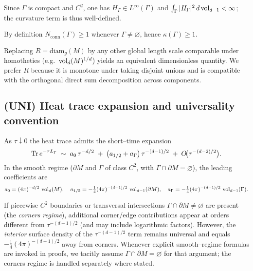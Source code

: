 \begin{remark}\label{rem:H-L2}
Since $\Gamma$ is compact and $C^2$, one has $H_\Gamma\in L^\infty(\Gamma)$ and $\int_\Gamma |H_\Gamma|^2\,d\operatorname{vol}_{d-1}<\infty$; the curvature term is thus well-defined.
\end{remark}

\begin{remark}\label{rem:kappa-nondeg}
By definition $N_{\mathrm{conn}}(\Gamma)\ge 1$ whenever $\Gamma\neq\varnothing$, hence $\kappa(\Gamma)\ge 1$.
\end{remark}

\begin{remark}\label{rem:R-choice}
Replacing $R=\mathrm{diam}_g(M)$ by any other global length scale comparable under homotheties (e.g.\ $\operatorname{vol}_d(M)^{1/d}$) yields an equivalent dimensionless quantity.
We prefer $R$ because it is monotone under taking disjoint unions and is compatible with the orthogonal direct sum decomposition across components.
\end{remark}

\subsection{(UNI) Heat trace expansion and universality convention}

\begin{definition}\label{def:heat-expansion}
As $\tau\downarrow 0$ the heat trace admits the short–time expansion
\[
\operatorname{Tr} e^{-\tau L_\Gamma}
\;\sim\; a_0\,\tau^{-d/2}\;+\;\big(a_{1/2}+a_\Gamma\big)\,\tau^{-(d-1)/2}\;+\;O\!\big(\tau^{-(d-2)/2}\big).
\]
In the smooth regime ($\partial M$ and $\Gamma$ of class $C^2$, with $\Gamma\cap\partial M=\varnothing$), the leading coefficients are
\[
a_0=(4\pi)^{-d/2}\,\operatorname{vol}_d(M),\quad
a_{1/2}=-\tfrac14(4\pi)^{-(d-1)/2}\,\operatorname{vol}_{d-1}(\partial M),\quad
a_\Gamma=-\tfrac14(4\pi)^{-(d-1)/2}\,\operatorname{vol}_{d-1}(\Gamma).
\]
\end{definition}

\begin{remark}\label{rem:corners}
If piecewise $C^2$ boundaries or transversal intersections $\Gamma\cap\partial M\neq\varnothing$ are present (the \emph{corners regime}),
additional corner/edge contributions appear at orders different from $\tau^{-(d-1)/2}$ (and may include logarithmic factors).
However, the \emph{interior} surface density of the $\tau^{-(d-1)/2}$ term remains universal and equals $-\tfrac14(4\pi)^{-(d-1)/2}$ away from corners.
Whenever explicit smooth–regime formulas are invoked in proofs, we tacitly assume $\Gamma\cap\partial M=\varnothing$ for that argument; the corners regime is handled separately where stated.
\end{remark}


